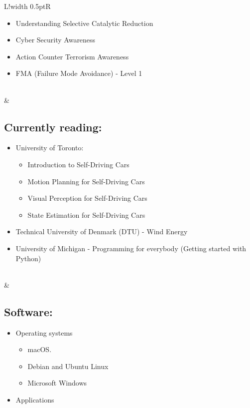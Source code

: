 \documentclass[a4paper]{article}
\newcommand\VRule{\color{lightgray}\vrule width 0.5pt}
\begin{document}
\begin{tabularx}{\textwidth}{L!{\VRule}R}
\begin{itemize}
\begin{itemize}
        \item Understanding Selective Catalytic Reduction
        \item Cyber Security Awareness
        \item Action Counter Terrorism Awareness
        \item FMA (Failure Mode Avoidance) - Level 1
        \end{itemize}
    \end{itemize} \\
    &\subsection{Currently reading:}
    \begin{itemize}
        \item University of Toronto:
        \begin{itemize}
            \item Introduction to Self-Driving Cars
            \item Motion Planning for Self-Driving Cars
            \item Visual Perception for Self-Driving Cars
            \item State Estimation for Self-Driving Cars
        \end{itemize}
        \item Technical University of Denmark (DTU) - Wind Energy
        \item University of Michigan - Programming for everybody (Getting started with Python)
\end{itemize} \\
    &\subsection{Software:}
    \begin{itemize}
        \item Operating systems
        \begin{itemize}
            \item macOS.
            \item Debian and Ubuntu Linux
            \item Microsoft Windows
        \end{itemize}
        \item Applications
        \begin{itemize}

\end{itemize}
\end{itemize}
\end{tabularx}
\end{document}
